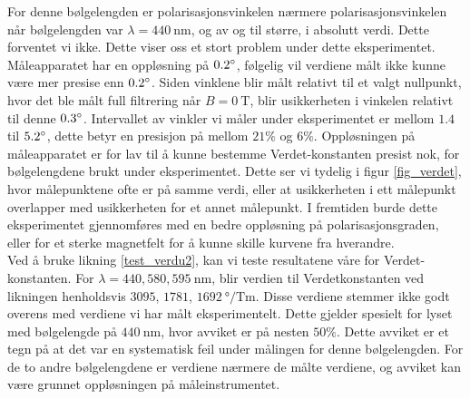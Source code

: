 \documentclass[%
 reprint,
 amsmath,amssymb,
 aps,
 norsk,
]{revtex4-1}
\begin{document}
For denne bølgelengden er polarisasjonsvinkelen nærmere polarisasjonsvinkelen når bølgelengden var $\lambda=\SI{440}{\nano\meter}$, og av og til større, i absolutt verdi. Dette forventet vi ikke. Dette viser oss et stort problem under dette eksperimentet. Måleapparatet har en oppløsning på $0.2\degree$, følgelig vil verdiene målt ikke kunne være mer presise enn $0.2\degree$. Siden vinklene blir målt relativt til et valgt nullpunkt, hvor det ble målt full filtrering når $B=\SI{0}{\tesla}$, blir usikkerheten i vinkelen relativt til denne $0.3\degree$. Intervallet av vinkler vi måler under eksperimentet er mellom $1.4$ til $5.2\degree$, dette betyr en presisjon på mellom $21\%$ og $6\%$. Oppløsningen på måleapparatet er for lav til å kunne bestemme Verdet-konstanten presist nok, for bølgelengdene brukt under eksperimentet. Dette ser vi tydelig i figur \vref{fig_verdet}, hvor målepunktene ofte er på samme verdi, eller at usikkerheten i ett målepunkt overlapper med usikkerheten for et annet målepunkt. I fremtiden burde dette eksperimentet gjennomføres med en bedre oppløsning på polarisasjonsgraden, eller for et sterke magnetfelt for å kunne skille kurvene fra hverandre.\\
Ved å bruke likning \eqref{test_verdu2}, kan vi teste resultatene våre for Verdet-konstanten. For $\lambda = 440, 580, \SI{595}{\nano\meter}$, blir verdien til Verdetkonstanten ved likningen henholdsvis $3095$, $1781$, $\SI{1692}{\degree/\tesla\meter}$. Disse verdiene stemmer ikke godt overens med verdiene vi har målt eksperimentelt. Dette gjelder spesielt for lyset med bølgelengde på $\SI{440}{\nano\meter}$, hvor avviket er på nesten $50\%$. Dette avviket er et tegn på at det var en systematisk feil under målingen for denne bølgelengden. For de to andre bølgelengdene er verdiene nærmere de målte verdiene, og avviket kan være grunnet oppløsningen på måleinstrumentet.
\end{document}
